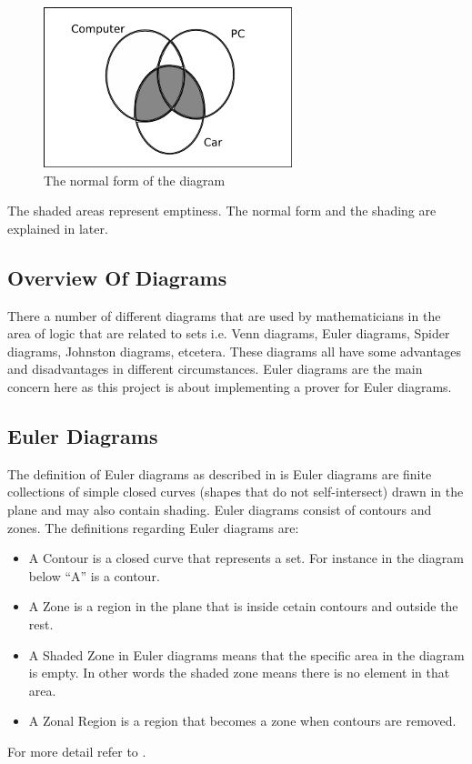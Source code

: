 \documentclass[10pt, a4paper, titlepage]{article}
\begin{document}
\begin{figure}[h]
\centering
\includegraphics{images/diag2_22.png}
\caption{The normal form of the diagram}
\end{figure}

The shaded areas represent emptiness. The normal form and the shading are explained in later.

\subsection{Overview Of Diagrams}
There a number of different diagrams that are used by mathematicians in the area of logic that are related to sets i.e. Venn diagrams, Euler diagrams, Spider diagrams, Johnston diagrams, etcetera. These diagrams all have some advantages and disadvantages in different circumstances. Euler diagrams are the main concern here as this project is about implementing a prover for Euler diagrams. 

\subsection{Euler Diagrams}

The definition of Euler diagrams as described in \cite{Fish_2007} is Euler diagrams are finite collections of simple closed curves (shapes that do not self-intersect) drawn in the plane and may also contain shading. Euler diagrams consist of contours and zones. The definitions regarding Euler diagrams are:
\begin{itemize}
\item A Contour is a closed curve that represents a set. For instance in the diagram below “A” is a contour.
\item A Zone is a region in the plane that is inside cetain contours and outside the rest. 
\item A Shaded Zone in Euler diagrams means that the specific area in the diagram is empty. In other words the shaded zone means there is no element in that area.
\item A Zonal Region is a region that becomes a zone when contours are removed. 
\end{itemize}
For more detail refer to \cite{Fish_2007}.
\end{document}
